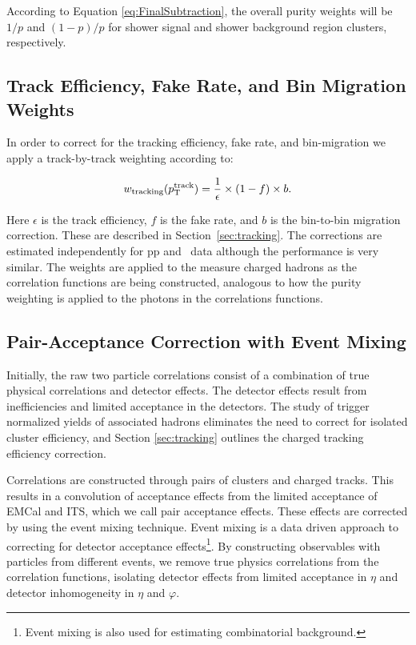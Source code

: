 According to Equation \ref{eq:FinalSubtraction}, the overall purity weights will be $1/p$ and $(1-p)/p$ for shower signal and shower background region clusters, respectively. 

\subsection{Track Efficiency, Fake Rate, and Bin Migration Weights}
In order to correct for the tracking efficiency, fake rate, and bin-migration we apply a track-by-track weighting according to:

\begin{equation}
  w_{\mathrm{tracking}}(p_{\mathrm{T}}^{\mathrm{track}}) = \frac{1}{\epsilon}\times(1- f)\times b.
\end{equation}

Here $\epsilon$ is the track efficiency, $f$ is the fake rate, and $b$ is the bin-to-bin migration correction. These are described in Section~\ref{sec:tracking}. The corrections are estimated independently for pp and \pPb~data although the performance is very similar. The weights are applied to the measure charged hadrons as the correlation functions are being constructed, analogous to how the purity weighting is applied to the photons in the correlations functions.

\subsection{Pair-Acceptance Correction with Event Mixing}

\label{sec:EventMixing}
Initially, the raw two particle correlations consist of a combination of true physical correlations and detector effects. The detector effects result from inefficiencies and limited acceptance in the detectors. The study of trigger normalized yields of associated hadrons eliminates the need to correct for isolated cluster efficiency, and Section \ref{sec:tracking} outlines the charged tracking efficiency correction. %

Correlations are constructed through pairs of clusters and charged tracks. This results in a convolution of acceptance effects from the limited acceptance of EMCal and ITS, which we call pair acceptance effects. These effects are corrected by using the event mixing technique. Event mixing is a data driven approach to correcting for detector acceptance effects\footnote{Event mixing is also used for estimating combinatorial background.}. By constructing observables with particles from different events, we remove true physics correlations from the correlation functions, isolating detector effects from limited acceptance in \(\eta\) and detector inhomogeneity in $\eta$ and $\varphi$. 


